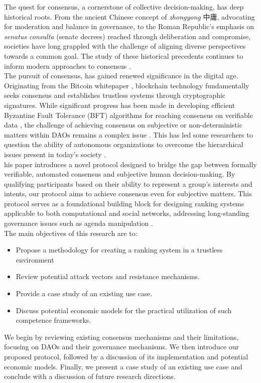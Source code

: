 \documentclass{article}
\begin{document}
\begin{CJK}{UTF8}{gbsn}
\begin{multicols}{2}
        The quest for consensus, a cornerstone of collective decision-making, has deep historical roots. From the ancient Chinese concept of \textit{zhongyong} {
            中庸}, advocating for moderation and balance in governance, to the Roman Republic's emphasis on \textit{senatus consulta} (senate decrees) reached through deliberation and compromise, societies have long grappled with the challenge of aligning diverse perspectives towards a common goal. The study of these historical precedents continues to inform modern approaches to consensus \cite{Andersen2019} \cite{Frederic2014}. \\
        The pursuit of consensus, has gained renewed significance in the digital age. Originating from the Bitcoin whitepaper \cite{Satoshi}, blockchain technology fundamentally seeks consensus and establishes trustless systems through cryptographic signatures. While significant progress has been made in developing efficient Byzantine Fault Tolerance (BFT) algorithms for reaching consensus on verifiable data \cite{Genrui2023}, the challenge of achieving consensus on subjective or non-deterministic matters within DAOs \cite{Hassan2021} remains a complex issue \cite{Shuai2019}\cite{Rainer2023}. This has led some researchers to question the ability of autonomous organizations to overcome the hierarchical issues present in today's society \cite{Marcella2016} \cite{Xuan2024}.   \\
        his paper introduces a novel protocol designed to bridge the gap between formally verifiable, automated consensus and subjective human decision-making. By qualifying participants based on their ability to represent a group's interests and intents, our protocol aims to achieve consensus even for subjective matters. This protocol serves as a foundational building block for designing ranking systems applicable to both computational and social networks, addressing long-standing governance issues such as agenda manipulation  \cite{McKelvey1976}.\\
        The main objectives of this research are to:

        \begin{itemize}[nosep]
            \item Propose a methodology for creating a ranking system in a trustless environment
            \item Review potential attack vectors and resistance mechanisms.
            \item Provide a case study of an existing use case.
            \item Discuss potential economic models for the practical utilization of such competence frameworks.
        \end{itemize}
        We begin by reviewing existing consensus mechanisms and their limitations, focusing on DAOs and their governance mechanisms. We then introduce our proposed protocol, followed by a discussion of its implementation and potential economic models. Finally, we present a case study of an existing use case and conclude with a discussion of future research directions.


\end{multicols}
\end{CJK}
\end{document}
